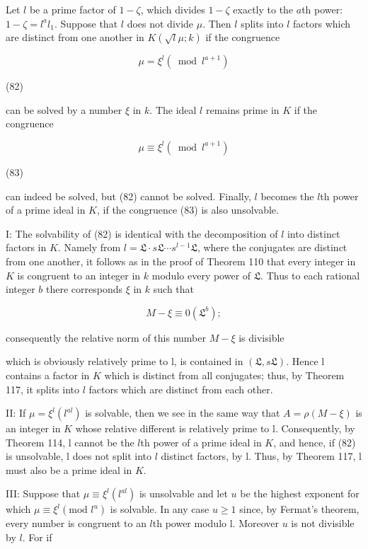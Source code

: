 Let $l$ be a prime factor of $1 - \zeta$, which divides $1 - \zeta$ exactly to the $a$th power: $1 - \zeta = l^a l_1$. Suppose that $l$ does not divide $\mu$. Then $l$ splits into $l$ factors which are distinct from one another in $K(\sqrt{l}\mu; k)$ if the congruence

$$\mu = \xi^l (\bmod l^{a+1})$$

(82)

can be solved by a number $\xi$ in $k$. The ideal $l$ remains prime in $K$ if the congruence

$$\mu \equiv \xi^l (\bmod l^{a+1})$$

(83)

can indeed be solved, but (82) cannot be solved. Finally, $l$ becomes the $l$th power of a prime ideal in $K$, if the congruence (83) is also unsolvable.

I: The solvability of (82) is identical with the decomposition of $l$ into distinct factors in $K$. Namely from $l = \mathfrak{L} \cdot s\mathfrak{L} \cdots s^{l-1}\mathfrak{L}$, where the conjugates are distinct from one another, it follows as in the proof of Theorem 110 that every integer in $K$ is congruent to an integer in $k$ modulo every power of $\mathfrak{L}$. Thus to each rational integer $b$ there corresponds $\xi$ in $k$ such that

$$M - \xi \equiv 0 (\mathfrak{L}^b);$$

consequently the relative norm of this number $M - \xi$ is divisible

which is obviously relatively prime to l, is contained in $(\mathfrak{L}, s\mathfrak{L})$. Hence l contains a factor in $K$ which is distinct from all conjugates; thus, by Theorem 117, it splits into $l$ factors which are distinct from each other.

II: If $\mu = \xi^l(l^{al})$ is solvable, then we see in the same way that $A = \rho(M - \xi)$ is an integer in $K$ whose relative different is relatively prime to l. Consequently, by Theorem 114, l cannot be the $l$th power of a prime ideal in $K$, and hence, if (82) is unsolvable, l does not split into $l$ distinct factors, by l. Thus, by Theorem 117, l must also be a prime ideal in $K$.

III: Suppose that $\mu \equiv \xi^l(l^{al})$ is unsolvable and let $u$ be the highest exponent for which $\mu \equiv \xi^l(\text{mod } l^u)$ is solvable. In any case $u \geq 1$ since, by Fermat’s theorem, every number is congruent to an $l$th power modulo l. Moreover $u$ is not divisible by $l$. For if

